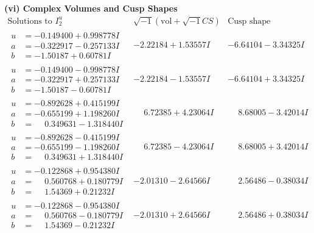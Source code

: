\documentclass[1p]{elsarticle_modified}
\theoremstyle{definition}
\newcommand{\I}{\sqrt{-1}}
\begin{document}
\newpage\flushleft \textbf{(vi) Complex Volumes and Cusp Shapes}
$$\begin{array}{c|c|c}  
\text{Solutions to }I^u_{2}& \I (\text{vol} + \sqrt{-1}CS) & \text{Cusp shape}\\
 \hline 
\begin{aligned}
u &= -0.149400 + 0.998778 I \\
a &= -0.322917 - 0.257133 I \\
b &= -1.50187 + 0.60781 I\end{aligned}
 & -2.22184 + 1.53557 I & -6.64104 - 3.34325 I \\ \hline\begin{aligned}
u &= -0.149400 - 0.998778 I \\
a &= -0.322917 + 0.257133 I \\
b &= -1.50187 - 0.60781 I\end{aligned}
 & -2.22184 - 1.53557 I & -6.64104 + 3.34325 I \\ \hline\begin{aligned}
u &= -0.892628 + 0.415199 I \\
a &= -0.655199 + 1.198260 I \\
b &= \phantom{-}0.349631 - 1.318440 I\end{aligned}
 & \phantom{-}6.72385 + 4.23064 I & \phantom{-}8.68005 - 3.42014 I \\ \hline\begin{aligned}
u &= -0.892628 - 0.415199 I \\
a &= -0.655199 - 1.198260 I \\
b &= \phantom{-}0.349631 + 1.318440 I\end{aligned}
 & \phantom{-}6.72385 - 4.23064 I & \phantom{-}8.68005 + 3.42014 I \\ \hline\begin{aligned}
u &= -0.122868 + 0.954380 I \\
a &= \phantom{-}0.560768 + 0.180779 I \\
b &= \phantom{-}1.54369 + 0.21232 I\end{aligned}
 & -2.01310 - 2.64566 I & \phantom{-}2.56486 - 0.38034 I \\ \hline\begin{aligned}
u &= -0.122868 - 0.954380 I \\
a &= \phantom{-}0.560768 - 0.180779 I \\
b &= \phantom{-}1.54369 - 0.21232 I\end{aligned}
 & -2.01310 + 2.64566 I & \phantom{-}2.56486 + 0.38034 I \\ \hline\begin{aligned}

\end{aligned}
\end{array}$$
\end{document}
